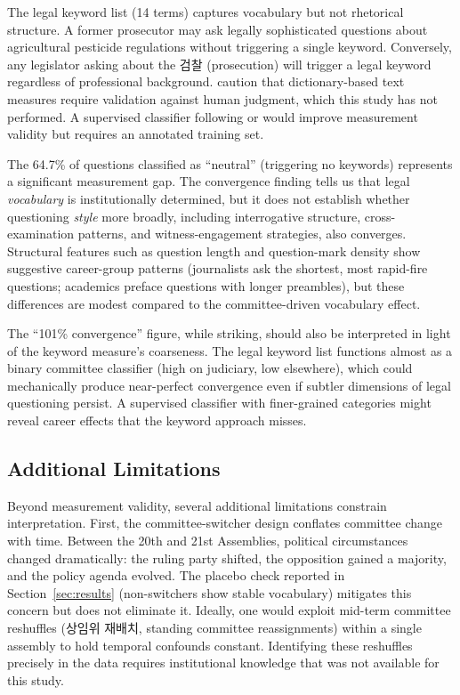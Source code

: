 \documentclass[11pt]{article}
\begin{document}
The legal keyword list (14 terms) captures vocabulary but not rhetorical structure. A former prosecutor may ask legally sophisticated questions about agricultural pesticide regulations without triggering a single keyword. Conversely, any legislator asking about the 검찰 (prosecution) will trigger a legal keyword regardless of professional background. \citet{grimmer2022} caution that dictionary-based text measures require validation against human judgment, which this study has not performed. A supervised classifier following \citet{han2022} or \citet{matsuo2025} would improve measurement validity but requires an annotated training set.

The 64.7\% of questions classified as ``neutral'' (triggering no keywords) represents a significant measurement gap. The convergence finding tells us that legal \textit{vocabulary} is institutionally determined, but it does not establish whether questioning \textit{style} more broadly, including interrogative structure, cross-examination patterns, and witness-engagement strategies, also converges. Structural features such as question length and question-mark density show suggestive career-group patterns (journalists ask the shortest, most rapid-fire questions; academics preface questions with longer preambles), but these differences are modest compared to the committee-driven vocabulary effect.

The ``101\% convergence'' figure, while striking, should also be interpreted in light of the keyword measure's coarseness. The legal keyword list functions almost as a binary committee classifier (high on judiciary, low elsewhere), which could mechanically produce near-perfect convergence even if subtler dimensions of legal questioning persist. A supervised classifier with finer-grained categories might reveal career effects that the keyword approach misses.

\subsection{Additional Limitations}

Beyond measurement validity, several additional limitations constrain interpretation. First, the committee-switcher design conflates committee change with time. Between the 20th and 21st Assemblies, political circumstances changed dramatically: the ruling party shifted, the opposition gained a majority, and the policy agenda evolved. The placebo check reported in Section~\ref{sec:results} (non-switchers show stable vocabulary) mitigates this concern but does not eliminate it. Ideally, one would exploit mid-term committee reshuffles (상임위 재배치, standing committee reassignments) within a single assembly to hold temporal confounds constant. Identifying these reshuffles precisely in the data requires institutional knowledge that was not available for this study.
\end{document}
